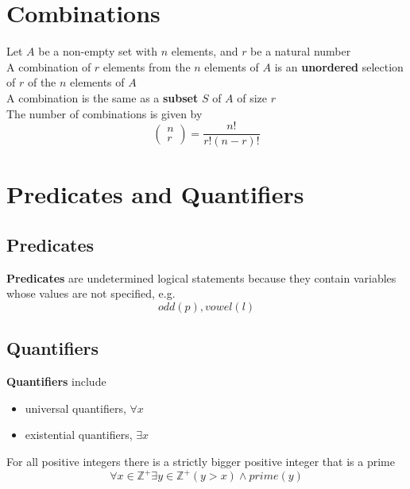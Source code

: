 \section{Combinations}

\begin{framed}
   Let $A$ be a non-empty set with $n$ elements, and $r$ be a natural number \\

   A combination of $r$ elements from the $n$ elements of $A$ is an \textbf{unordered} selection of $r$ of the $n$ elements of $A$ \\

   A combination is the same as a \textbf{subset} $S$ of $A$ of size $r$ \\

   The number of combinations is given by 
   \[
     \begin{pmatrix} n \\ r \end{pmatrix}  = \frac{n!}{r! (n-r)!}
   \] 
\end{framed}

\section{Predicates and Quantifiers}

\subsection{Predicates}
\begin{framed}
   \textbf{Predicates} are undetermined logical statements because they contain variables whose values are not specified, e.g.
   \[
     odd(p), vowel(l)
   \] 
\end{framed}

\subsection{Quantifiers}
\begin{framed}
   \textbf{Quantifiers} include 
   \begin{itemize}
      \item universal quantifiers, $\forall x$
      \item existential quantifiers, $\exists x$
   \end{itemize}
\end{framed}

For all positive integers there is a strictly bigger positive integer that is a prime
\[
   \forall x \in \mathbb{Z}^{+} \exists  y \in \mathbb{Z}^+ (y > x) \land prime(y)
\] 




